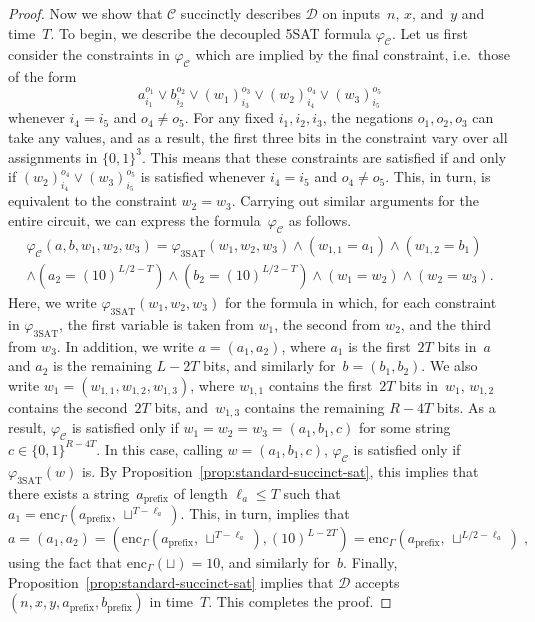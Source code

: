 \documentclass[11pt]{article}
\theoremstyle{definition}
\newcommand{\decider}{\mathcal{D}}
\newcommand{\circuit}{\mathcal{C}}
\begin{document}
\begin{proof}
  Now we show that $\circuit$ succinctly describes $\decider$ on inputs~$n$,
  $x$, and~$y$ and time~$T$.
  To begin, we describe the decoupled 5SAT formula $\varphi_{\circuit}$.
  Let us first consider the constraints in $\varphi_{\circuit}$ which are
  implied by the final constraint, i.e.\ those of the form
  \begin{equation*}
    a_{i_1}^{o_1} \lor b_{i_2}^{o_2} \lor (w_1)_{i_3}^{o_3} \lor (w_2)_{i_4}^{o_4}
    \lor (w_3)_{i_5}^{o_5}
  \end{equation*}
  whenever $i_4 = i_5$ and $o_4 \neq o_5$.
  For any fixed $i_1, i_2, i_3$, the negations $o_1, o_2, o_3$ can take any
  values, and as a result, the first three bits in the constraint vary over all
  assignments in $\{0, 1\}^3$.
  This means that these constraints are satisfied if and only if
  $(w_2)_{i_4}^{o_4} \lor (w_3)_{i_5}^{o_5}$ is satisfied whenever $i_4 = i_5$
  and $o_4 \neq o_5$.
  This, in turn, is equivalent to the constraint $w_2 = w_3$.
  Carrying out similar arguments for the entire circuit, we can express the
  formula~$\varphi_{\circuit}$ as follows.
  \begin{multline*}
    \varphi_{\circuit}(a, b, w_1, w_2, w_3)
    =
    \varphi_{\mathrm{3SAT}}(w_1, w_2, w_3)
    \land (w_{1, 1} = a_1) \land (w_{1, 2} = b_1)\\
    \land (a_2= (10)^{L/2 -T}) \land (b_2 = (10)^{L/2-T})
    \land (w_1 = w_2)
    \land (w_2 = w_3).
  \end{multline*}
  Here, we write $\varphi_{\mathrm{3SAT}}(w_1, w_2, w_3)$ for the formula in
  which, for each constraint in $\varphi_{\mathrm{3SAT}}$, the first variable is
  taken from $w_1$, the second from $w_2$, and the third from $w_3$.
  In addition, we write $a = (a_1, a_2)$, where $a_1$ is the first~$2T$ bits
  in~$a$ and $a_2$ is the remaining $L-2T$ bits, and similarly for~$b = (b_1,
  b_2)$.
  We also write $w_1 = (w_{1,1}, w_{1,2}, w_{1,3})$, where $w_{1, 1}$ contains
  the first~$2T$ bits in~$w_1$, $w_{1,2}$ contains the second~$2T$ bits,
  and~$w_{1,3}$ contains the remaining $R-4T$ bits.
  As a result, $\varphi_{\circuit}$ is satisfied only if $w_1 = w_2 = w_3 =
  (a_1, b_1, c)$ for some string $c \in \{0, 1\}^{R-4T}$.
  In this case, calling $w = (a_1, b_1, c)$, $\varphi_{\circuit}$ is satisfied
  only if $\varphi_{\mathrm{3SAT}}(w)$ is.
  By Proposition~\ref{prop:standard-succinct-sat}, this implies that there exists a
  string~$a_{\mathrm{prefix}}$ of length $\ell_a \leq T$ such that $ a_1 =
  \mathrm{enc}_\Gamma(a_{\mathrm{prefix}},\,\sqcup^{T-\ell_a})$.
  This, in turn, implies that
  \begin{equation*}
    a = (a_1, a_2) = (\mathrm{enc}_\Gamma(a_{\mathrm{prefix}},\,
    \sqcup^{T-\ell_a}), (10)^{L-2T})
    = \mathrm{enc}_\Gamma(a_{\mathrm{prefix}},\,\sqcup^{L/2-\ell_a})\;,
  \end{equation*}
  using the fact that $\mathrm{enc}_\Gamma(\sqcup) = 10$, and similarly for~$b$.
  Finally, Proposition~\ref{prop:standard-succinct-sat} implies that $\decider$
  accepts $(n, x, y, a_{\mathrm{prefix}}, b_{\mathrm{prefix}})$ in time~$T$.
  This completes the proof.
\end{proof}
\end{document}
